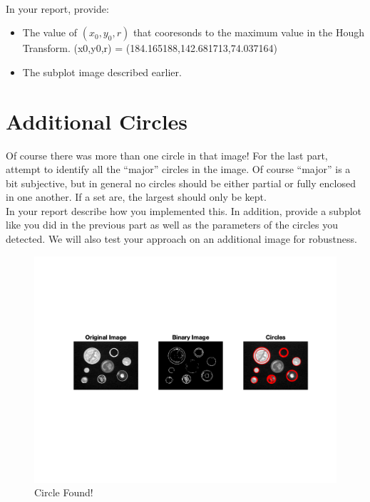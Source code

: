 \documentclass[12pt]{article}
\begin{document}
\noindent
\\
In your report, provide:
\begin{itemize}
\item The value of $(x_0, y_0, r)$ that cooresonds to the maximum value in the Hough Transform.
(x0,y0,r) = (184.165188,142.681713,74.037164)
\item The subplot image described earlier.
\end{itemize}


\newpage
\section{Additional Circles}
Of course there was more than one circle in that image!  For the last part, attempt to identify all the ``major'' circles in the image.  Of course ``major'' is a bit subjective, but in general no circles should be either partial or fully enclosed in one another.  If a set are, the largest should only be kept.\\

\noindent
In your report describe how you implemented this. In addition, provide a subplot like you did in the previous part as well as the parameters of the circles you detected.  We will also test your approach on an additional image for robustness.

\begin{figure}[H]
\begin{center}
\includegraphics[width=\textwidth]{part6.png}
\caption{Circle Found!}
\label{fig4}
\end{center}
\end{figure}
\end{document}
